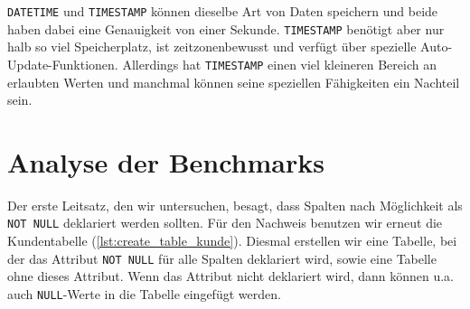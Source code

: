 \texttt{DATETIME} und \texttt{TIMESTAMP} können dieselbe Art von Daten speichern und beide haben dabei eine Genauigkeit von einer Sekunde.
\texttt{TIMESTAMP} benötigt aber nur halb so viel Speicherplatz, ist zeitzonenbewusst und verfügt über spezielle Auto-Update-Funktionen.
Allerdings hat \texttt{TIMESTAMP} einen viel kleineren Bereich an erlaubten Werten und manchmal können seine speziellen Fähigkeiten ein Nachteil sein.

\section{Analyse der Benchmarks}

Der erste Leitsatz, den wir untersuchen, besagt, dass Spalten nach Möglichkeit als \texttt{NOT NULL} deklariert werden sollten.
Für den Nachweis benutzen wir erneut die Kundentabelle (\ref{lst:create_table_kunde}).
Diesmal erstellen wir eine Tabelle, bei der das Attribut \texttt{NOT NULL} für alle Spalten deklariert wird, sowie eine Tabelle ohne dieses Attribut.
Wenn das Attribut nicht deklariert wird, dann können u.a. auch \texttt{NULL}-Werte in die Tabelle eingefügt werden.


